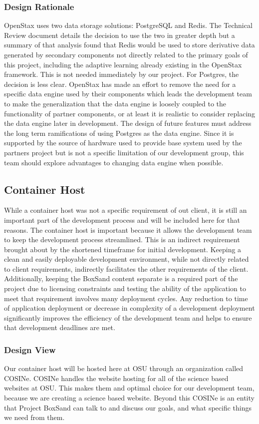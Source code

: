 \documentclass[onecolumn, draftclsnofoot,10pt, compsoc]{IEEEtran}
\begin{document}
\subsubsection{Design Rationale}
OpenStax uses two data storage solutions: PostgreSQL and Redis. The Technical Review document details the decision to use the two in greater depth but a summary of that analysis found that Redis would be used to store derivative data generated by secondary components not directly related to the primary goals of this project, including the adaptive learning already existing in the OpenStax framework. This is not needed immediately by our project. For Postgres, the decision is less clear. OpenStax has made an effort to remove the need for a specific data engine used by their components which leads the development team to make the generalization that the data engine is loosely coupled to the functionality of partner components, or at least it is realistic to consider replacing the data engine later in development. The design of future features must address the long term ramifications of using Postgres as the data engine. Since it is supported by the source of hardware used to provide base system used by the partners project but is not a specific limitation of our development group, this team should explore advantages to changing data engine when possible.

\subsection{Container Host}
While a container host was not a specific requirement of out client, it is still an important part of the development process and will be included here for that reasons. The container host is  important because it allows the development team to keep the development process streamlined. This is an indirect requirement brought about by the shortened timeframe for initial development. Keeping a clean and easily deployable development environment, while not directly related to client requirements, indirectly facilitates the other requirements of the client. Additionally,  keeping the BoxSand content separate is a required part of the project due to licensing constraints and testing the ability of the application to meet that requirement involves many deployment cycles. Any reduction to time of application deployment or decrease in complexity of a development deployment significantly improves the efficiency of the development team and helps to ensure that development deadlines are met.
\subsubsection{Design View}
Our container host will be hosted here at OSU through an organization called COSINe. COSINe handles the website hosting for all of the science based websites at OSU. This makes them and optimal choice for our development team, because we are creating a science based website. Beyond this COSINe is an entity that Project BoxSand can talk to and discuss our goals, and what specific things we need from them.
\end{document}
